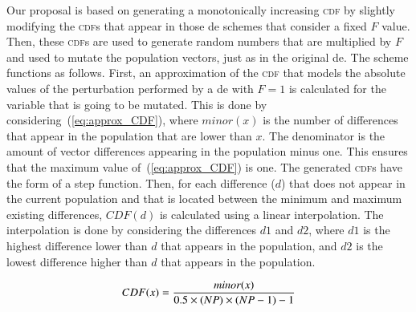 \documentclass[review,3p]{elsarticle}
\newcommand{\DE}{{\sc de}}
\begin{document}
%
%
%
%
%
%
Our proposal is based on generating a monotonically increasing \textsc{cdf} %
by slightly modifying the \textsc{cdf}s that appear in those \DE{} schemes that consider a fixed $F$ value.
%
Then, these \textsc{cdf}s are used to generate random numbers that are multiplied
by $F$ and used to mutate the population vectors, just as in the original \DE{}.
%
The scheme functions as follows.
%
First, an approximation of the \textsc{cdf} that models the absolute values
of the perturbation performed by a \DE{} with $F = 1$ is calculated for the variable that is going to be mutated.
%
This is done by considering~(\ref{eq:approx_CDF}), where $minor(x)$ is the number of differences that appear in
the population that are lower than $x$.
%
The denominator is the amount of vector differences appearing in the population minus one.
%
This ensures that the maximum value of~(\ref{eq:approx_CDF}) is one.
%
The generated \textsc{cdf}s have the form of a step function.
%
Then, for each difference ($d$) that does not appear in the current population and that is located between the minimum and maximum
existing differences, $CDF(d)$ is calculated using a linear interpolation.
%
The interpolation is done by considering the differences $d1$ and $d2$, where $d1$ is the highest
difference lower than $d$ that appears in the population, and $d2$ is the lowest difference higher than $d$ that appears in the population.

\begin{equation}
	\label{eq:approx_CDF}
		CDF(x) = {{minor(x)}\over{0.5 \times (NP) \times (NP-1) - 1}}
\end{equation}
\end{document}
